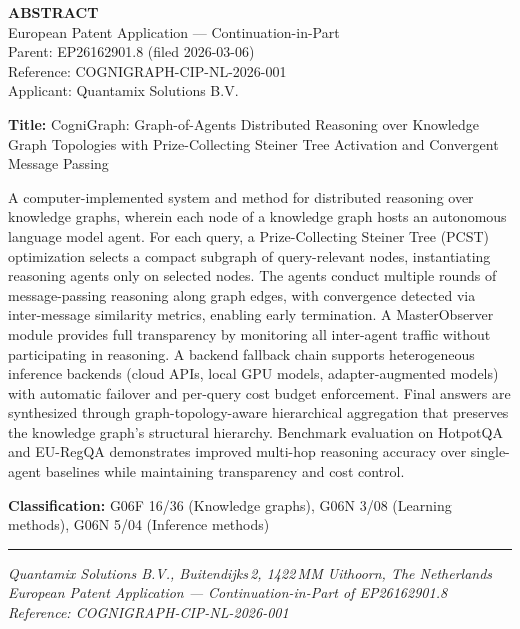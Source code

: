 \documentclass[a4paper,12pt]{article}
\begin{document}
\begin{center}
{\large\bfseries ABSTRACT}\\[3mm]
{\normalsize European Patent Application --- Continuation-in-Part}\\[1mm]
{\normalsize Parent: EP26162901.8 (filed 2026-03-06)}\\[1mm]
{\normalsize Reference: COGNIGRAPH-CIP-NL-2026-001}\\[1mm]
{\normalsize Applicant: Quantamix Solutions B.V.}
\end{center}

\vspace{8mm}

\noindent\textbf{Title:} CogniGraph: Graph-of-Agents Distributed Reasoning over Knowledge Graph Topologies with Prize-Collecting Steiner Tree Activation and Convergent Message Passing

\vspace{6mm}

\noindent A computer-implemented system and method for distributed reasoning over knowledge graphs, wherein each node of a knowledge graph hosts an autonomous language model agent. For each query, a Prize-Collecting Steiner Tree (PCST) optimization selects a compact subgraph of query-relevant nodes, instantiating reasoning agents only on selected nodes. The agents conduct multiple rounds of message-passing reasoning along graph edges, with convergence detected via inter-message similarity metrics, enabling early termination. A MasterObserver module provides full transparency by monitoring all inter-agent traffic without participating in reasoning. A backend fallback chain supports heterogeneous inference backends (cloud APIs, local GPU models, adapter-augmented models) with automatic failover and per-query cost budget enforcement. Final answers are synthesized through graph-topology-aware hierarchical aggregation that preserves the knowledge graph's structural hierarchy. Benchmark evaluation on HotpotQA and EU-RegQA demonstrates improved multi-hop reasoning accuracy over single-agent baselines while maintaining transparency and cost control.

\vspace{6mm}

\noindent\textbf{Classification:} G06F 16/36 (Knowledge graphs), G06N 3/08 (Learning methods), G06N 5/04 (Inference methods)

\vspace{15mm}

\noindent\rule{\textwidth}{0.4pt}

\begin{center}
{\small\itshape Quantamix Solutions B.V., Buitendijks\,2, 1422\,MM Uithoorn, The Netherlands\\
European Patent Application --- Continuation-in-Part of EP26162901.8\\
Reference: COGNIGRAPH-CIP-NL-2026-001}
\end{center}
\end{document}
